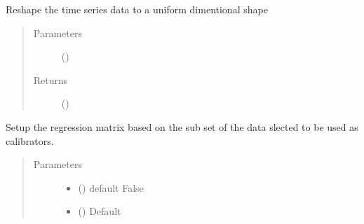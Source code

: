 \documentclass[a4paper,10pt,english]{sphinxmanual}
\begin{document}
\begin{fulllineitems}
\begin{fulllineitems}
\begin{quote}
\begin{description}
\end{description}\end{quote}

\end{fulllineitems}


\begin{fulllineitems}
\label{\detokenize{cascade.TSO:cascade.TSO.TSO.TSOSuite.reshape_data}}
Reshape the time series data to a uniform dimentional shape
\begin{quote}\begin{description}
\item[{Parameters}] \leavevmode
{} () \textendash{} 

\item[{Returns}] \leavevmode
{} ()

\end{description}\end{quote}

\end{fulllineitems}


\begin{fulllineitems}
\label{\detokenize{cascade.TSO:cascade.TSO.TSO.TSOSuite.return_all_design_matrices}}
Setup the regression matrix based on the sub set of the data slected
to be used as calibrators.
\begin{quote}\begin{description}
\item[{Parameters}] \leavevmode\begin{itemize}
\item {} 
 () \textendash{} default False

\item {} 
 () \textendash{} Default 


\end{itemize}
\end{description}
\end{quote}
\end{fulllineitems}
\end{fulllineitems}
\end{document}
